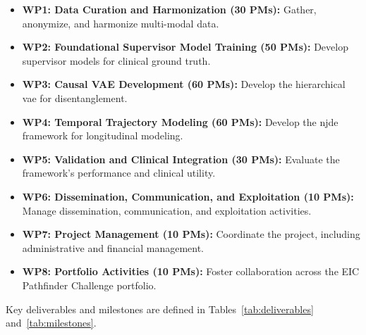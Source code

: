 \documentclass[11pt, a4paper]{article}
\begin{document}
\begin{itemize}
    \item \textbf{WP1: Data Curation and Harmonization (30 PMs):} Gather, anonymize, and harmonize multi-modal data.
    \item \textbf{WP2: Foundational Supervisor Model Training (50 PMs):} Develop supervisor models for clinical ground truth.
    \item \textbf{WP3: Causal VAE Development (60 PMs):} Develop the hierarchical \gls{vae} for disentanglement.
    \item \textbf{WP4: Temporal Trajectory Modeling (60 PMs):} Develop the \gls{njde} framework for longitudinal modeling.
    \item \textbf{WP5: Validation and Clinical Integration (30 PMs):} Evaluate the framework's performance and clinical utility.
    \item \textbf{WP6: Dissemination, Communication, and Exploitation (10 PMs):} Manage dissemination, communication, and exploitation activities.
    \item \textbf{WP7: Project Management (10 PMs):} Coordinate the project, including administrative and financial management.
    \item \textbf{WP8: Portfolio Activities (10 PMs):} Foster collaboration across the EIC Pathfinder Challenge portfolio.
\end{itemize}

Key deliverables and milestones are defined in Tables~\ref{tab:deliverables} and~\ref{tab:milestones}.
\end{document}
